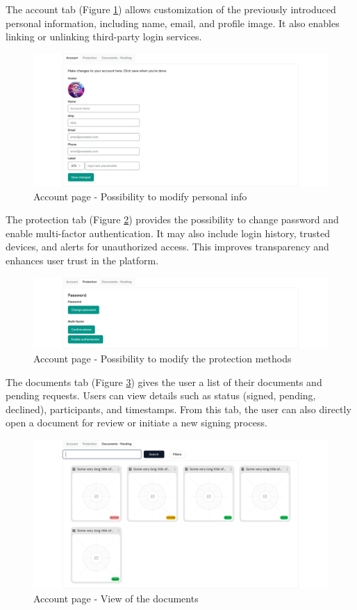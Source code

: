 The account tab (Figure \ref{accountspage-account}) allows customization of the previously introduced personal information, including name, email, and profile image. 
It also enables linking or unlinking third-party login services. 

\begin{figure}[H]
    \centering
    \includegraphics[width=18cm]{"images/figmaUI/accountspage-account-crop.png"}
    \caption{Account page - Possibility to modify personal info}
    \label{accountspage-account}
\end{figure}

The protection tab (Figure \ref{accountspage-protection}) provides the possibility to change password and enable multi-factor authentication. 
It may also include login history, trusted devices, and alerts for unauthorized access. 
This improves transparency and enhances user trust in the platform.

\begin{figure}[H]
    \centering
    \includegraphics[width=18cm]{"images/figmaUI/accountspage-protection-crop.png"}
    \caption{Account page - Possibility to modify the protection methods}
    \label{accountspage-protection}
\end{figure}

The documents tab (Figure \ref{accountspage-documents}) gives the user a list of their documents and pending requests. 
Users can view details such as status (signed, pending, declined), participants, and timestamps. 
From this tab, the user can also directly open a document for review or initiate a new signing process. 

\begin{figure}[H]
    \centering
    \includegraphics[width=18cm]{"images/figmaUI/accountspage-documents-crop.png"}
    \caption{Account page - View of the documents}
    \label{accountspage-documents}
\end{figure}
